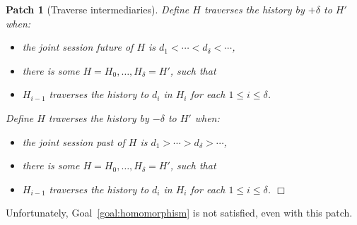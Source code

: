 \documentclass{notes}
\newcommand{\aNH}{H}
\newcommand{\ltChron}{<}
\newcommand{\gtChron}{>}
\newcommand{\aDoc}{d}
\newtheorem{patch}{Patch}
\newcommand{\QED}{\hfill$\Box$}
\begin{document}
\begin{patch}[Traverse intermediaries]
Define \emph{$\aNH$ traverses the history by $+\delta$ to $\aNH'$} when:
\begin{itemize}
\item the joint session future of $\aNH$ is $\aDoc_1 \ltChron \cdots \ltChron \aDoc_\delta \ltChron \cdots$,
\item there is some $\aNH=\aNH_0,\ldots,\aNH_\delta=\aNH'$, such that
\item $H_{i-1}$ traverses the history to $d_i$ in $H_i$ for each $1 \le i \le \delta$.
\end{itemize}
Define \emph{$\aNH$ traverses the history by $-\delta$ to $\aNH'$} when:
\begin{itemize}
\item the joint session past of $\aNH$ is $\aDoc_1 \gtChron \cdots \gtChron \aDoc_\delta \gtChron \cdots$,
\item there is some $\aNH=\aNH_0,\ldots,\aNH_\delta=\aNH'$, such that
\item $H_{i-1}$ traverses the history to $d_i$ in $H_i$ for each $1 \le i \le \delta$.
  \QED
\end{itemize}
\end{patch}
Unfortunately, Goal~\ref{goal:homomorphism} is not satisfied,
even with this patch.
\end{document}
